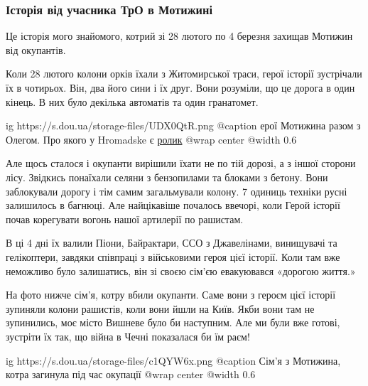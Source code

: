  
 
 
 
 

\subsubsection{Історія від учасника ТрО в Мотижині}

Це історія мого знайомого, котрий зі 28 лютого по 4 березня захищав Мотижин від
окупантів.

Коли 28 лютого колони орків їхали з Житомирської траси, герої історії
зустрічали їх в чотирьох. Він, два його сини і їх друг. Вони розуміли, що це
дорога в один кінець. В них було декілька автоматів та один гранатомет.

\ifcmt
  ig https://s.dou.ua/storage-files/UDX0QtR.png
	@caption ерої Мотижина разом з Олегом. Про якого у Hromadske є \href{https://youtu.be/HPqmJA3MbU0}{ролик}
  @wrap center
  @width 0.6
\fi

Але щось сталося і окупанти вирішили їхати не по тій дорозі, а з іншої сторони
лісу. Звідкись понаїхали селяни з бензопилами та блоками з бетону. Вони
заблокували дорогу і тім самим загальмували колону. 7 одиниць техніки русні
залишилось в багнюці. Але найцікавіше почалось ввечорі, коли Герой історії
почав корегувати вогонь нашої артилерії по рашистам.

В ці 4 дні їх валили Піони, Байрактари, ССО з Джавелінами, винищувачі та
гелікоптери, завдяки співпраці з військовими героя цієї історії. Коли там вже
неможливо було залишатись, він зі своєю сім'єю евакуювався «дорогою життя.»

На фото нижче сім'я, котру вбили окупанти. Саме вони з героєм цієї історії
зупиняли колони рашистів, коли вони йшли на Київ. Якби вони там не зупинились,
моє місто Вишневе було би наступним. Але ми були вже готові, зустріти їх так,
що війна в Чечні показалася би їм раєм!

\ifcmt
  ig https://s.dou.ua/storage-files/c1QYW6x.png
	@caption Сім'я з Мотижина, котра загинула під час окупації
  @wrap center
  @width 0.6
\fi
